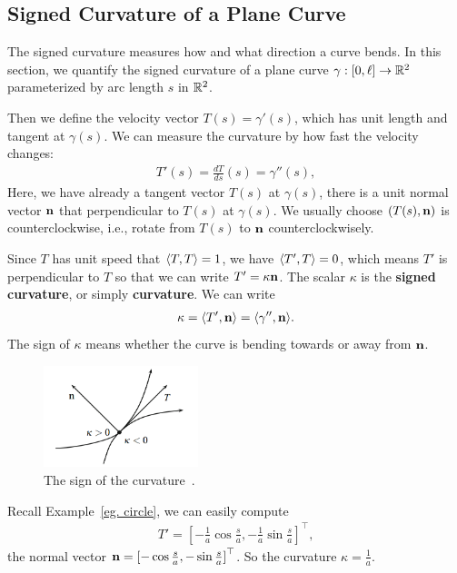 \subsection{Signed Curvature of a Plane Curve}
The signed curvature measures how and what direction a curve bends. In this section, we quantify the signed curvature
of a plane curve $\gamma: [0, \ell] \rightarrow {\mathbb{R}}^2$ parameterized by arc length $s$ in ${\mathbb{R}}^2$.

Then we define the velocity vector $T(s)=\gamma'(s)$, which has unit length and tangent at $\gamma(s)$.
We can measure the curvature by how fast the velocity changes:
\begin{align}
    T'(s)=\frac{dT}{ds}(s)=\gamma''(s), \nonumber
\end{align}
Here, we have already
a tangent vector $T(s)$ at $\gamma(s)$, there is a unit normal vector ${\mathbf{n}}$ that perpendicular to $T(s)$ at $\gamma(s)$.
We usually choose $(T(s), {\mathbf{n}})$ is counterclockwise, i.e., rotate from $T(s)$ to ${\mathbf{n}}$ counterclockwisely.

Since $T$ has unit speed that $\langle T, T \rangle=1$, we have $\langle T', T \rangle=0$, which means $T'$ is perpendicular to
$T$ so that we can write $T'=\kappa{\mathbf{n}}$. The scalar $\kappa$ is the \textbf{signed curvature}, or simply \textbf{curvature}.
We can write
\begin{align}
    \kappa = \langle T', {\mathbf{n}} \rangle=\langle \gamma'', {\mathbf{n}} \rangle.
\end{align}
The sign of $\kappa$ means whether the curve is bending towards or away from ${\mathbf{n}}$.
\begin{figure}[htb]
    \centering
    \includegraphics[width=0.4\textwidth]{../Lectures/Figures/curvature.png}
    \caption{The sign of the curvature~\cite[p.~12]{tu2010introduction}.}
\end{figure}
\begin{example}
    Recall Example~\ref{eg. circle}, we can easily compute 
    \begin{align}
        T'=[-\frac{1}{a}\cos\frac{s}{a}, -\frac{1}{a}\sin\frac{s}{a}]^\top, \nonumber
    \end{align}
    the normal vector ${\mathbf{n}}={[-\cos\frac{s}{a}, -\sin\frac{s}{a}]}^\top$.
    So the curvature $\kappa=\frac{1}{a}$.
\end{example}
